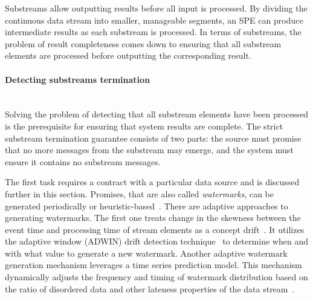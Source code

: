 Substreams allow outputting results before all input is processed. By dividing the continuous data stream into smaller, manageable segments, an SPE can produce intermediate results as each substream is processed. In terms of substreams, the problem of result completeness comes down to ensuring that all substream elements are processed before outputting the corresponding result. 

\paragraph{Detecting substreams termination}\mbox{} \\

Solving the problem of detecting that all substream elements have been processed is the prerequisite for ensuring that system results are complete. The strict substream termination guarantee consists of two parts: the source must promise that no more messages from the substream may emerge, and the system must ensure it contains no substream messages. 

The first task requires a contract with a particular data source and is discussed further in this section. Promises, that are also called {\em watermarks}, can be generated periodically or heuristic-based~\cite{Akidau:2013:MFS:2536222.2536229, akidau2015streaming}. There are adaptive approaches to generating watermarks. The first one treats change in the skewness between the event time and processing time of stream elements as a concept drift~\cite{awad2019adaptive}. It utilizes the adaptive window (ADWIN) drift detection technique~\cite{bifet2007learning, grulich2018scalable} to determine when and with what value to generate a new watermark. Another adaptive watermark generation mechanism leverages a time series prediction model. This mechanism dynamically adjusts the frequency and timing of watermark distribution based on the ratio of disordered data and other lateness properties of the data stream~\cite{song2021adaptive}.

